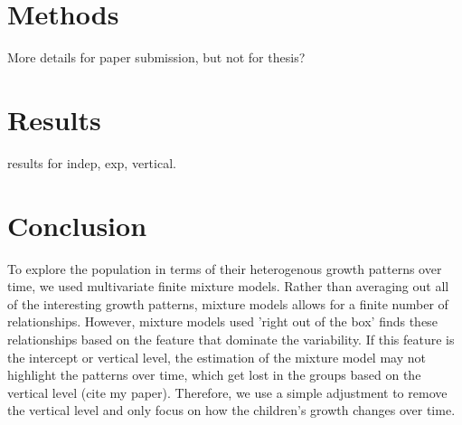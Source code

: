 \documentclass[11pt]{article}
\begin{document}
\section{Methods}
More details for paper submission, but not for thesis?

\section{Results}

results for indep, exp, vertical. 


\section{Conclusion}
To explore the population in terms of their heterogenous growth patterns over time, we used multivariate finite mixture models. Rather than averaging out all of the interesting growth patterns, mixture models allows for a finite number of relationships. However, mixture models used 'right out of the box' finds these relationships based on the feature that dominate the variability. If this feature is the intercept or vertical level, the estimation of the mixture model may not highlight the patterns over time, which get lost in the groups based on the vertical level (cite my paper). Therefore, we use a simple adjustment to remove the vertical level and only focus on how the children's growth changes over time.\\\\
\end{document}
